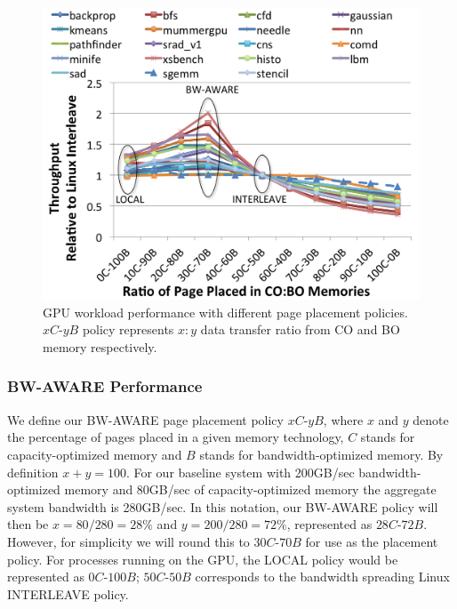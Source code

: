 \begin{figure}[t]
    \includegraphics[width=\columnwidth]{asplos2015/figures/bw-aware-2.png} 
    \caption{GPU workload performance with different page placement policies.
$xC$-$yB$ policy represents $x:y$ data transfer ratio from CO and BO memory respectively.}
    \label{fig:baseline}
\end{figure}

\subsubsection{BW-AWARE Performance\\}
We define our BW-AWARE page placement policy $xC$-$yB$, where $x$ and $y$ denote the
percentage of pages placed in a given memory technology, $C$ stands for capacity-optimized
memory and $B$ stands for bandwidth-optimized memory. By definition $x+y=100$. For our baseline
system with 200GB/sec bandwidth-optimized memory and 80GB/sec of capacity-optimized memory the
aggregate system bandwidth is 280GB/sec.  In this
notation, our BW-AWARE policy will then be $x=80/280=28\%$ and $y=200/280=72\%$, represented as
$28C$-$72B$. However, for simplicity we will round this to $30C$-$70B$ for use as the 
placement policy.  For processes running on the GPU, the LOCAL policy
would be represented as $0C$-$100B$; $50C$-$50B$ corresponds to the bandwidth spreading Linux
INTERLEAVE policy.

